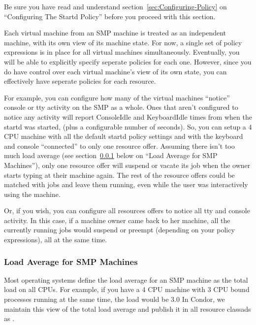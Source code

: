 \Note Be sure you have read and understand
section~\ref{sec:Configuring-Policy} on ``Configuring The Startd
Policy'' before you proceed with this section.

Each virtual machine from an SMP machine is treated as an independent
machine, with its own view of its machine state.
For now, a single set of policy expressions is in place for all
virtual machines simultaneously.  
Eventually, you will be able to explicitly specify seperate policies
for each one.
However, since you do have control over each virtual machine's view of
its own state, you can effectively have seperate policies for each
resource.

For example, you can configure how many of the virtual machines
``notice'' console or tty activity on the SMP as a whole.
Ones that aren't configured to notice any activity will report
ConsoleIdle and KeyboardIdle times from when the startd was started,
(plus a configurable number of seconds).
So, you can setup a 4 CPU machine with all the default startd policy
settings and with the keyboard and console ``connected'' to only one
resource offer.  
Assuming there isn't too much load average (see
section~\ref{sec:SMP-Load} below on ``Load Average for SMP
Machines''), only one resource offer will suspend or vacate its job
when the owner starts typing at their machine again.
The rest of the resource offers could be matched with jobs and leave
them running, even while the user was interactively using the
machine. 

Or, if you wish, you can configure all resources offers to notice all
tty and console activity.
In this case, if a machine owner came back to her machine, all the
currently running jobs would suspend or preempt (depending on your
policy expressions), all at the same time.

\subsubsection{Load Average for SMP Machines}
\label{sec:SMP-Load}

Most operating systems define the load average for an SMP machine as
the total load on all CPUs.
For example, if you have a 4 CPU machine with 3 CPU bound processes
running at the same time, the load would be 3.0
In Condor, we maintain this view of the total load average and publish
it in all resource classads as .

